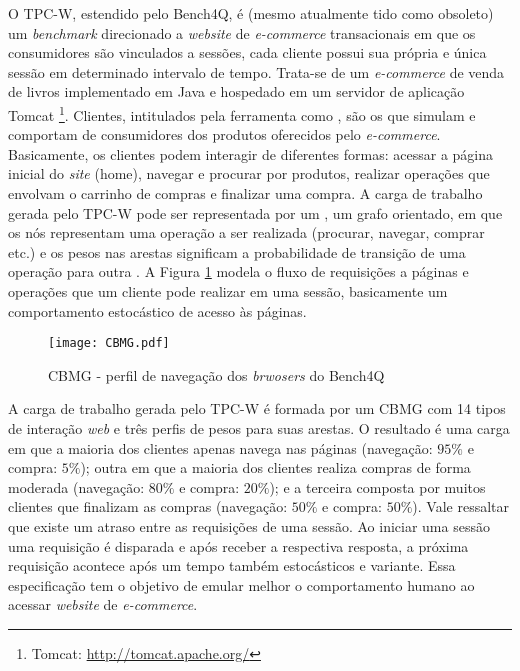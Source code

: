 O TPC-W, estendido pelo Bench4Q, é (mesmo atualmente tido como obsoleto) um \textit{benchmark} direcionado a \textit{website} de \textit{e-commerce} transacionais em que os consumidores são vinculados a sessões, cada cliente possui sua própria e única sessão em determinado intervalo de tempo. Trata-se de um \textit{e-commerce} de venda de livros implementado em Java e hospedado em um servidor de aplicação Tomcat \footnote{Tomcat: \url{http://tomcat.apache.org/}}. Clientes, intitulados pela ferramenta como , são os que simulam e comportam de consumidores dos produtos oferecidos pelo \textit{e-commerce}. Basicamente, os clientes podem interagir de diferentes formas: acessar a página inicial do \textit{site} (home), navegar e procurar por produtos, realizar operações que envolvam o carrinho de compras e finalizar uma compra. A carga de trabalho gerada pelo TPC-W pode ser representada por um , um grafo orientado, em que os nós representam uma operação a ser realizada (procurar, navegar, comprar etc.) e os pesos nas arestas significam a probabilidade de transição de uma operação para outra \cite{Zhang2011}. A Figura \ref{fig:CBMG} modela o fluxo de requisições a páginas e operações que um cliente pode realizar em uma sessão, basicamente um comportamento estocástico de acesso às páginas.

\begin{figure}[htb]
	\centering
	\texttt{[image: CBMG.pdf]}
	\caption{CBMG - perfil de navegação dos \textit{brwosers} do Bench4Q}
	\label{fig:CBMG}
\end{figure}


A carga de trabalho gerada pelo TPC-W é formada por um CBMG com 14 tipos de interação \textit{web} e três perfis de pesos para suas arestas. O resultado é uma carga em que a maioria dos clientes apenas navega nas páginas (navegação: $95\%$ e compra: $5\%$); outra em que a maioria dos clientes realiza compras de forma moderada (navegação: $80\%$ e compra: $20\%$); e a terceira composta por muitos clientes que finalizam as compras (navegação: $50\%$ e compra: $50\%$). Vale ressaltar que existe um atraso entre as requisições de uma sessão. Ao iniciar uma sessão uma requisição é disparada e após receber a respectiva resposta, a próxima requisição acontece após um tempo também estocásticos e variante. Essa especificação tem o objetivo de emular melhor o comportamento humano ao acessar \textit{website} de \textit{ e-commerce}.

